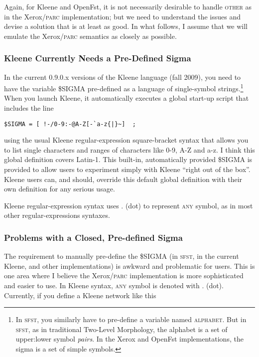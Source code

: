 \documentclass[letterpaper,11pt]{article}
\providecommand{\acro}{}\renewcommand{\acro}{\textsc}
\begin{document}
Again, for Kleene and OpenFst, it is not necessarily desirable to
handle \acro{other} as in the Xerox/\acro{parc} implementation; but we
need to understand the issues and devise a solution that is at least
as good.  In what follows, I assume that we will emulate the Xerox/\acro{parc} semantics
as closely as possible.


\subsubsection{Kleene Currently Needs a Pre-Defined Sigma}

In the current 0.9.0.x versions of the Kleene  
language (fall 2009), you need to have the variable  
\$SIGMA pre-defined as a language of single-symbol strings.\footnote{In \acro{sfst}, you similarly  
have to pre-define a variable named \acro{alphabet}.   But in \acro{sfst}, as in  
traditional Two-Level Morphology, the alphabet is a set of upper:lower  
symbol \emph{pairs}.  In the Xerox and OpenFst implementations, the sigma is a set  
of simple symbols.}   When you launch Kleene, it automatically executes 
a global start-up script that includes the line

\begin{Verbatim}[fontsize=\footnotesize]
$SIGMA = [ !-/0-9:-@A-Z[-`a-z{|}~]  ;
\end{Verbatim}

\noindent
using the usual Kleene regular-expression square-bracket syntax that
allows you to list single characters and ranges of characters like
0-9, A-Z and a-z.  I think this global definition covers Latin-1.
This built-in, automatically provided \$SIGMA is provided to allow
users to experiment simply with Kleene ``right out of the box''.
Kleene users can, and should, override this default global definition
with their own definition for any serious usage.

Kleene regular-expression syntax uses  .  (dot) to represent
\acro{any} symbol, 
as in most other regular-expressions syntaxes.

\subsubsection{Problems with a Closed, Pre-defined Sigma}

The requirement to manually pre-define the \$SIGMA (in 
\acro{sfst}, in the current Kleene, and other implementations) is awkward and problematic for users.  This
is one area where I believe the Xerox/\acro{parc} implementation is more sophisticated and
easier to use.  In Kleene syntax, \acro{any} symbol is denoted with . (dot).
Currently, if you define a Kleene network like this
\end{document}
